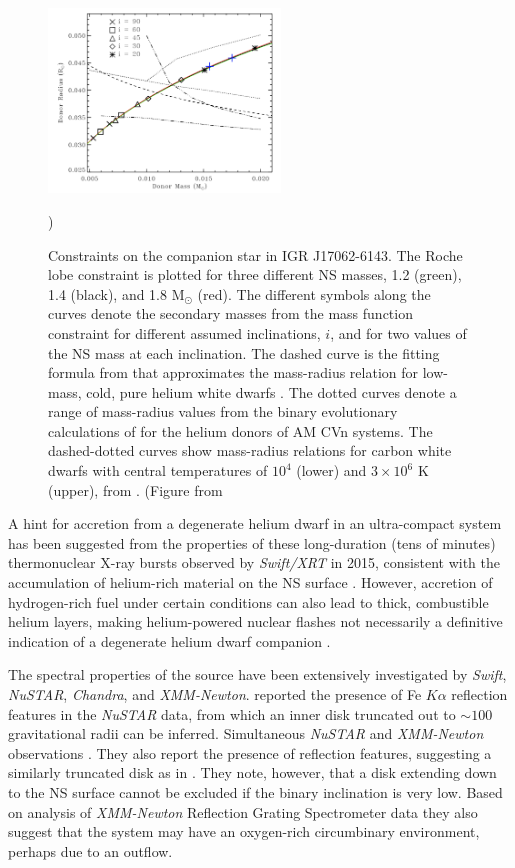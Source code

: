 \documentclass[graybox]{svmult}
\def \swift {{\em Swift\xspace}}
\def \chandra {{\em Chandra\xspace}}
\def \xmm {{\em XMM-Newton\xspace}}
\def \swiftxrt{{\em Swift/XRT\xspace}}
\def \nustar{{\em NuSTAR\xspace}}
\begin{document}
\begin{figure}
\centering
  \includegraphics[width=0.55\textwidth]{REVIEW_AMXP/17062_donor_Strohmayer_2018.png}
  \caption{Constraints on the companion star in IGR J17062-6143. The Roche lobe constraint is plotted for three different NS masses, 1.2 (green), 1.4 (black), and
1.8 M$_\odot$ (red). The different symbols along the curves denote the secondary masses
from the mass function constraint for different assumed inclinations, $i$, and for
two values of the NS mass at each inclination. The dashed curve is the fitting formula from \cite{Nelemans2001} that approximates the mass-radius relation for low-mass, cold,
pure helium white dwarfs \cite{Zapolsky1969}. The dotted curves
denote a range of mass-radius values from the binary evolutionary calculations of \cite{Deloye2007} for the helium donors of AM CVn systems. The
dashed-dotted curves show mass-radius relations for carbon white dwarfs with
central temperatures of $10^4$ (lower) and $3\times10^6$ K (upper), from \cite{Deloye2003}. (Figure from \cite{Strohmayer2018}})     
  \label{fig:17062_mass}
\end{figure}
A hint for accretion from a degenerate helium dwarf in an ultra-compact system has been suggested from the properties of these long-duration (tens of minutes) thermonuclear X-ray bursts observed by \swiftxrt{} in 2015, consistent with the accumulation of
helium-rich material on the NS surface \cite{Keek2017}. However, accretion of hydrogen-rich fuel under certain conditions can also lead to thick, combustible helium layers, making helium-powered nuclear flashes not necessarily a definitive indication of a degenerate helium dwarf companion \cite{Fujimoto1981,Galloway2006}. 
 

The spectral properties of the source have been extensively investigated by \swift{}, \nustar{}, \chandra{}, and \xmm{}. \cite{Degenaar2017} reported the presence of Fe $K\alpha$ reflection features in the \nustar{} data, from which an inner disk truncated out to $\sim100$ gravitational radii can be inferred. Simultaneous \nustar{} and \xmm{} observations \cite{VandenEijnden2018}. They also report the presence of reflection features, suggesting a similarly truncated disk as in \cite{Degenaar2017}. They note, however, that a disk extending down to the NS surface cannot be excluded if the binary inclination is very low. Based on analysis of \xmm{} Reflection Grating Spectrometer data they also suggest that the system may have an oxygen-rich circumbinary environment, perhaps due to an outflow.
\end{document}
